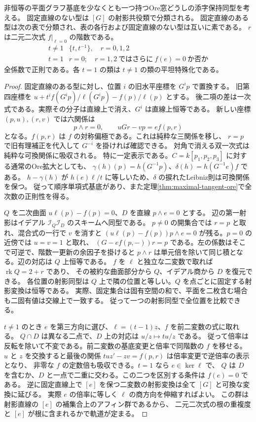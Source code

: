 \begin{theorem}\label{thm:plane-ore-unmarked}
非恒等の平面グラフ基底を少なくとも一つ持つOre窓どうしの添字保持同型を考える。
固定直線のない型は $[G]$ の射影共役類で分類される。
固定直線のある型は次の表で分類され、表の各行および固定直線のない型は互いに素である。
$r$ は二元二次式 $f|_{\ell=0}$ の階数である。
\[
\begin{array}{c|l}
 t\ne1 & \{t,t^{-1}\},\quad r=0,1,2\\
 t=1 & r=0;\quad r=1,2\ \text{ではさらに}\ f(e)=0\ \text{か否か}
\end{array}
\]
全係数で正則である。各 $t=1$ の類は $t\ne1$ の類の平坦特殊化である。
\end{theorem}
\begin{proof}
固定直線のある型に対し、位置 $i$ の旧水平座標を $G^ip$ で置換する。
旧第四座標を $u+t^i f(G^ip)/\ell(G^ip)-f(p)/\ell(p)$ とする。
後二項の差は一次式である。実際その分子は直線上で消え、$G^i$ は直線上恒等である。
新しい座標 $(p,u),(r,v)$ では六関係は
\[
 p\wedge r=0,\qquad u G r-vp=e f(p,r)
\]
となる。$f(p,r)$ は $f$ の対称偏極である。これは純粋な三関係を移し、
$r=p$ で旧有理補正を代入して $G^{-i}$ を掛ければ確認できる。
対角で消える双一次式は純粋な可換関係に吸収される。
特に一定表示である。$C=k[p_1,p_2,p_3]$ に対する通常のOre拡大としても、
$\gamma(h)(p)=h(G^{-1}p)$、$\delta(h)=h(G^{-1}e)f$ である。
$h-\gamma(h)$ が $h(e)\ell/t$ に等しいため、$\delta$ の捩れたLeibniz則は可換関係を保つ。
従って順序単項式基底があり、また定理\ref{thm:maximal-tangent-ore}で全次数の正則性を得る。

$Q$ を二次曲面 $u\ell(p)-f(p)=0$、$D$ を直線 $p\wedge e=0$ とする。
辺の第一射影はイデアル $\mathcal I_Q\mathcal I_D$ のスキームへ同型である。
$p\ne0$ の開集合では $r=p$ と取れ、混合式の一行で $v$ を消すと
$(u\ell(p)-f(p))p\wedge e=0$ が残る。$p=0$ の近傍では $u=v=1$ と取れ、
$(G-e f(p,-))r=p$ である。左の係数はそこで可逆で、階数一更新の余因子を掛けると
$p\wedge r$ は単元倍を除いて同じ積となる。辺の対応は $Q$ 上恒等である。
$f$ を $\ell$ と独立な二変数で取れば $\operatorname{rk}Q=2+r$ であり、
その被約な曲面部分から $Q$、イデアル商から $D$ を復元できる。
各位置の射影同型は $Q$ 上で隣の位置と等しい。$Q$ を点ごとに固定する射影変換は恒等である。
実際、固定集合は固有空間の和で、平面を二枚含む場合も二固有値は交線上で一致する。
従って一つの射影同型で全位置を比較できる。

$t\ne1$ のとき $e$ を第三方向に選び、$\ell=(t-1)z$、$f$ を前二変数の式に取れる。
$Q\cap D$ は異なる二点で、$D$ 上の対応は $u/z\mapsto t u/z$ である。
従って倍率は反転を除いて不変である。前二変数の基底変更と倍率で同階数の $f$ を移せる。
$u$ と $z$ を交換すると最後の関係 $tuz'-zv=f(p,r)$ は倍率変更で逆倍率の表示となり、
非零な $f$ の定数倍も吸収できる。$t=1$ なら $e\in\ker\ell$ で、
$Q$ は $D$ を含むか、$D$ と一点で二重に交わる。この二つを区別する条件は $f(e)=0$ である。
逆に固定直線上で $[e]$ を保つ二変数の射影変換は全て $[G]$ と可換な変換に延びる。
実際 $e$ の倍率に等しく $\ell$ の商方向を伸縮すればよい。
この群は射影直線の $[e]$ の補集合上のアフィン群であるから、
二元二次式の根の重複度と $[e]$ が根に含まれるかで軌道が定まる。


\end{proof}
